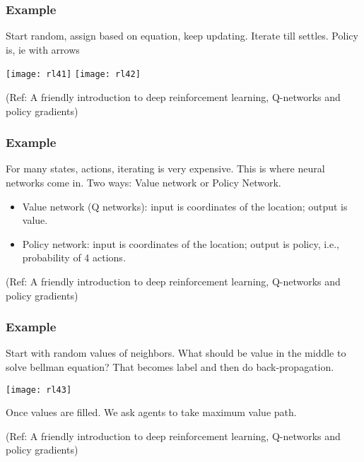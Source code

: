 \begin{frame}[fragile]\frametitle{Example}

Start random, assign based on equation, keep updating. Iterate till settles. Policy is, ie with arrows

\begin{center}
\texttt{[image: rl41]}
\texttt{[image: rl42]}

\end{center}

{\tiny (Ref: A friendly introduction to deep reinforcement learning, Q-networks and policy gradients)}

\end{frame}

\begin{frame}[fragile]\frametitle{Example}

For many states, actions, iterating is very expensive. This is where neural networks come in. Two ways: Value network or Policy Network.
\begin{itemize}
\item Value network (Q networks): input is coordinates of the location; output is value.
\item Policy network: input is coordinates of the location; output is policy, i.e., probability of 4 actions.
\end{itemize}


{\tiny (Ref: A friendly introduction to deep reinforcement learning, Q-networks and policy gradients)}

\end{frame}

\begin{frame}[fragile]\frametitle{Example}

Start with random values of neighbors. What should be value in the middle to solve bellman equation? That becomes label and then do back-propagation.

\begin{center}
\texttt{[image: rl43]}
\end{center}

Once values are filled. We ask agents to take maximum value path.

{\tiny (Ref: A friendly introduction to deep reinforcement learning, Q-networks and policy gradients)}

\end{frame}

